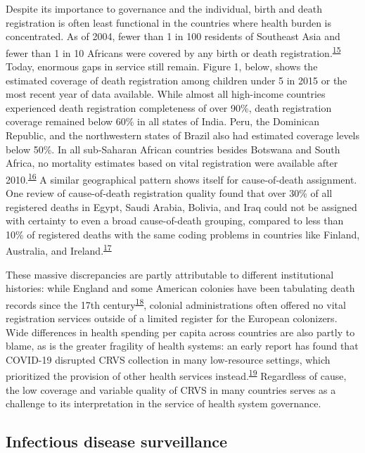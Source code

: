 \documentclass[
]{article}
\begin{document}
Despite its importance to governance and the individual, birth and death registration is often least functional in the countries where health burden is concentrated. As of 2004, fewer than 1 in 100 residents of Southeast Asia and fewer than 1 in 10 Africans were covered by any birth or death registration.\textsuperscript{\protect\hyperlink{ref-Mahapatra2007}{15}} Today, enormous gaps in service still remain. Figure 1, below, shows the estimated coverage of death registration among children under 5 in 2015 or the most recent year of data available. While almost all high-income countries experienced death registration completeness of over 90\%, death registration coverage remained below 60\% in all states of India. Peru, the Dominican Republic, and the northwestern states of Brazil also had estimated coverage levels below 50\%. In all sub-Saharan African countries besides Botswana and South Africa, no mortality estimates based on vital registration were available after 2010.\textsuperscript{\protect\hyperlink{ref-Roth2018}{16}} A similar geographical pattern shows itself for cause-of-death assignment. One review of cause-of-death registration quality found that over 30\% of all registered deaths in Egypt, Saudi Arabia, Bolivia, and Iraq could not be assigned with certainty to even a broad cause-of-death grouping, compared to less than 10\% of registered deaths with the same coding problems in countries like Finland, Australia, and Ireland.\textsuperscript{\protect\hyperlink{ref-Johnson2021}{17}}

These massive discrepancies are partly attributable to different institutional histories: while England and some American colonies have been tabulating death records since the 17th century\textsuperscript{\protect\hyperlink{ref-Blake1955}{18}}, colonial administrations often offered no vital registration services outside of a limited register for the European colonizers. Wide differences in health spending per capita across countries are also partly to blame, as is the greater fragility of health systems: an early report has found that COVID-19 disrupted CRVS collection in many low-resource settings, which prioritized the provision of other health services instead.\textsuperscript{\protect\hyperlink{ref-AbouZahr2021}{19}} Regardless of cause, the low coverage and variable quality of CRVS in many countries serves as a challenge to its interpretation in the service of health system governance.

\hypertarget{infectious-disease-surveillance}{%
\subsection{Infectious disease surveillance}\label{infectious-disease-surveillance}}
\end{document}
